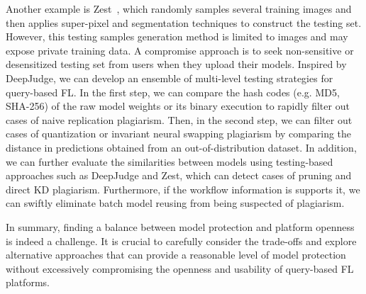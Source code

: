 Another example is Zest~\cite{jia2022zest}, which randomly samples several training images and then applies super-pixel and segmentation techniques to construct the testing set.
However, this testing samples generation method is limited to images and may expose private training data.
A compromise approach is to seek non-sensitive or desensitized testing set from users when they upload their models.
Inspired by DeepJudge, we can develop an ensemble of multi-level testing strategies for query-based FL.
In the first step, we can compare the hash codes (e.g. MD5, SHA-256) of the raw model weights or its binary execution to rapidly filter out cases of naive replication plagiarism.
Then, in the second step, we can filter out cases of quantization or invariant neural swapping plagiarism by comparing the distance in predictions obtained from an out-of-distribution dataset.
In addition, we can further evaluate the similarities between models using testing-based approaches such as DeepJudge and Zest, which can detect cases of pruning and direct KD plagiarism.
Furthermore, if the workflow information is supports it, we can swiftly eliminate batch model reusing from being suspected of plagiarism.

In summary, finding a balance between model protection and platform openness is indeed a challenge.
It is crucial to carefully consider the trade-offs and explore alternative approaches that can provide a reasonable level of model protection without excessively compromising the openness and usability of query-based FL platforms.

